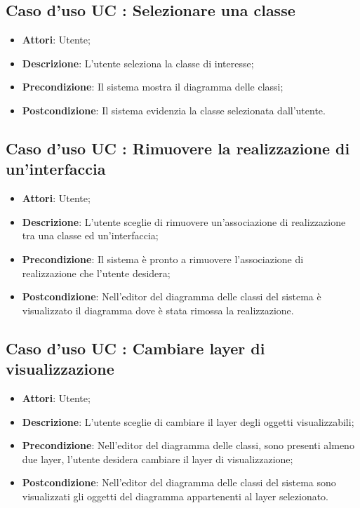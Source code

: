 \documentclass[../AnalisiDeiRequisiti.tex]{subfiles}
\begin{document}
		\subsection{Caso d'uso UC : Selezionare una classe}
			\begin{itemize}
				\item \textbf{Attori}: Utente;
				\item \textbf{Descrizione}: L'utente seleziona la classe di interesse;
				\item \textbf{Precondizione}: Il sistema mostra il diagramma delle classi;
				\item \textbf{Postcondizione}: Il sistema evidenzia la classe selezionata
				dall'utente.
			\end{itemize}
		\subsection{Caso d'uso UC : Rimuovere la realizzazione di un'interfaccia}
			\begin{itemize}
				\item \textbf{Attori}: Utente;
				\item \textbf{Descrizione}: L'utente sceglie di rimuovere un'associazione di
				realizzazione tra una classe ed un'interfaccia;
				\item \textbf{Precondizione}: Il sistema è pronto a rimuovere l'associazione
				di realizzazione che l'utente desidera;
				\item \textbf{Postcondizione}: Nell'editor del diagramma delle classi del
				sistema è visualizzato il diagramma dove è stata rimossa la realizzazione.
			\end{itemize}
			
		\subsection{Caso d'uso UC : Cambiare layer di visualizzazione}
			\begin{itemize}
				\item \textbf{Attori}: Utente;
				\item \textbf{Descrizione}: L'utente sceglie di cambiare il layer degli
				oggetti visualizzabili;
				\item \textbf{Precondizione}: Nell'editor del diagramma delle classi, sono
				presenti almeno due layer, l'utente desidera cambiare il layer di
				visualizzazione;
				\item \textbf{Postcondizione}: Nell'editor del diagramma delle classi del
				sistema sono visualizzati gli oggetti del diagramma appartenenti al layer
				selezionato.
			\end{itemize}
			
\end{document}
